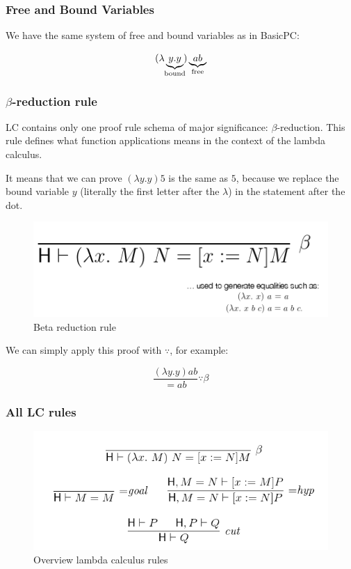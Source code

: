 \subsubsection{Free and Bound Variables}

We have the same system of free and bound variables as in BasicPC:

\[
	(\lambda \underbrace{y.y}_{\mathclap{\text{bound}}}) \underbrace{a b}_{\mathclap{\text{free}}}
\]

\subsubsection{$\beta$-reduction rule}

LC contains only one proof rule schema of major significance: $\beta$-reduction.  This rule defines what function applications means in the context of the lambda calculus.

It means that we can prove $(\lambda y.y) 5$ is the same as $5$, because we replace the bound variable $y$ (literally the first letter after the $\lambda$) in the statement after the dot.

\begin{figure}[H] %
\centering
\includegraphics[width=0.5\linewidth]{images/beta_reduction}
\caption{Beta reduction rule}
\label{fig:betareduction}
\end{figure}


We can simply apply this proof with $\because$, for example:

\[
	\frac{(\lambda y.y) a b}{= a b} \because \beta
\]

\subsubsection{All LC rules}

\begin{figure}[H]
\centering
\includegraphics[width=0.7\linewidth]{images/lc_rules}
\caption{Overview lambda calculus rules}
\label{fig:lcrules}
\end{figure}


